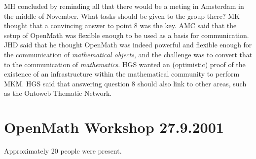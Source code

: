 \documentclass[11pt, a4paper]{article}
\begin{document}
MH concluded by reminding all that there would be a meting in Amsterdam in
the middle of November. What tasks should be given to the group there? MK
thought that a convincing answer to point 8 was the key. AMC said that the
setup of OpenMath was flexible enough to be used as a basis for
communication. JHD said that he thought OpenMath was indeed powerful and
flexible enough for the communication of {\it mathematical objects\/}, and
the challenge was to convert that to the communication of {\it
mathematics\/}. HGS wanted an (optimistic) proof of the existence of an
infrastructure within the mathematical community to perform MKM.  HGS said
that answering question 8 should also link to other areas, such as the
Ontoweb Thematic Network.
\section{OpenMath Workshop 27.9.2001}
Approximately 20 people were present.
\end{document}

